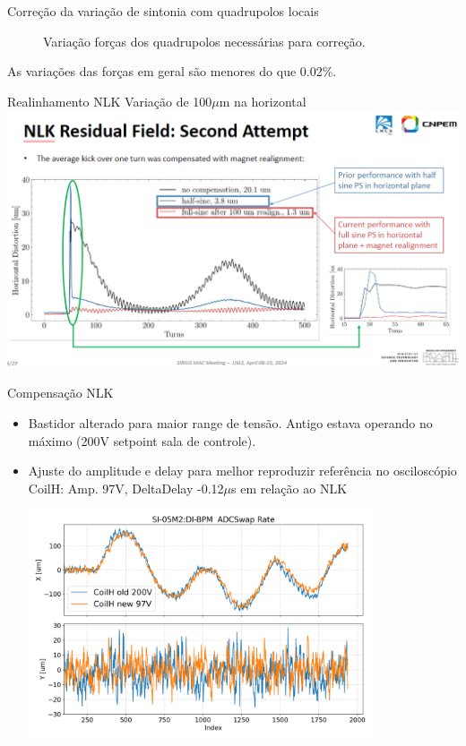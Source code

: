 \documentclass[1611]{beamer}            %
\begin{document}
\begin{frame}{Correção da variação de sintonia com quadrupolos locais}
\begin{figure}[ht]
\begin{minipage}[b]{0.45\linewidth}
            \caption{Variação forças dos quadrupolos necessárias para correção.}
            \label{fig:b}
        \end{minipage}
    \end{figure}
As variações das forças em geral são menores do que 0.02\%.
\end{frame}

\begin{frame}{Realinhamento NLK}
Variação de 100$\mu$m na horizontal
\centering
\includegraphics[scale=0.6]{2024-05-10/figures/nlk_perturb.PNG}
    
\end{frame}

\begin{frame}{Compensação NLK}
\begin{itemize}
    \item Bastidor alterado para maior range de tensão. Antigo estava operando no máximo (200V setpoint sala de controle).
    \item Ajuste do amplitude e delay para melhor reproduzir referência no osciloscópio \\
    CoilH: Amp. 97V, DeltaDelay -0.12$\mu$s em relação ao NLK

    \centering
    \includegraphics[width=0.8\textwidth]{2024-05-10/figures/coilh_old_new.png}
\end{itemize}
\end{frame}
\end{document}
